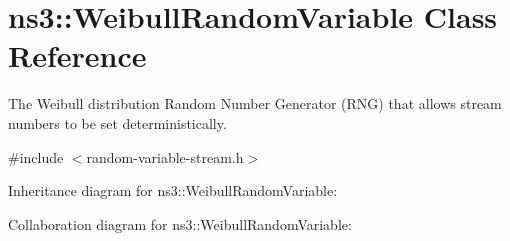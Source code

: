 \hypertarget{classns3_1_1WeibullRandomVariable}{}\section{ns3\+:\+:Weibull\+Random\+Variable Class Reference}
\label{classns3_1_1WeibullRandomVariable}


The Weibull distribution Random Number Generator (R\+NG) that allows stream numbers to be set deterministically.  




{\ttfamily \#include $<$random-\/variable-\/stream.\+h$>$}



Inheritance diagram for ns3\+:\+:Weibull\+Random\+Variable\+:


Collaboration diagram for ns3\+:\+:Weibull\+Random\+Variable\+:
